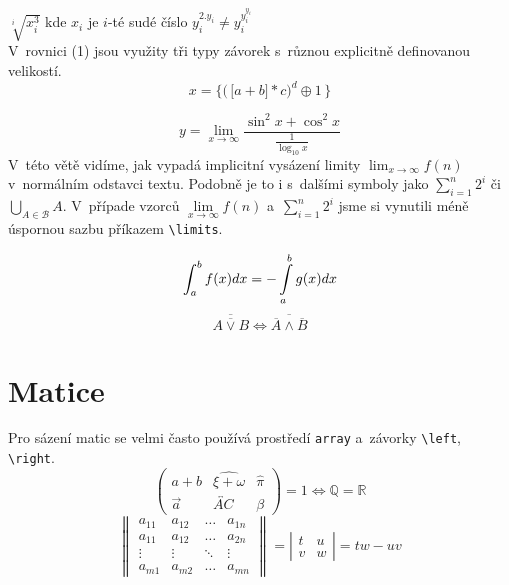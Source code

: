 \documentclass[a4paper, 11pt, twocolumn]{article}
\theoremstyle{definition}
\theoremstyle{definition}
\begin{document}
\quad $\sqrt[i]{x_i^3}$ kde $x_i$ je $i$-té sudé číslo \quad $y_i^{2.y_i}\neq y_i^{y_i^{y_i}}$\\


V~rovnici (1) jsou využity tři typy závorek s~různou explicitně definovanou velikostí.
\begin{equation}\label{rovnice_1}
x =\bigg\{\Big( \,\big[a + b\big] * c\Big)^d \oplus 1 \,\bigg\} 
\end{equation}

$$
y = \lim_{x\to\infty} \frac{\sin^2 x + \cos^2x}{\frac{1}{\log_{10}{x}}}
$$
V~této větě vidíme, jak vypadá implicitní vysázení limity $\lim_{x\to\infty} f(n)$ v~normálním odstavci textu. Podobně je to i s~dalšími symboly jako $\sum_{i=1}^{n} 2^{i}$ či $\bigcup_{A\in \mathcal{B}} A$. V~případe vzorců $\lim\limits_{x\to\infty} f(n)$ a~$\sum\limits_{i=1}^{n} 2^{i}$ jsme si vynutili méně úspornou sazbu příkazem \verb|\limits|.

\begin{equation}\label{rovnice_2}
\int_{a}^{b} f(x)dx = -\int\displaylimits_{a}^{b} g(x)dx
\end{equation}
\begin{equation}\label{rovnice_3}
\overline{\overline{ A\lor B}} \Leftrightarrow \overline{\overline{A} \land \overline{B}}
\end{equation}

\section{Matice}
Pro sázení matic se velmi často používá prostředí \verb|array| a~závorky \verb|\left|, \verb|\right|.
$$
\left(
\begin{array}{ccc}
a + b & \widehat{\xi + \omega} & \hat{\pi}\\
\vec{a} & \overleftrightarrow{AC} & \beta
\end{array}
\right) = 1 \iff \mathbb{Q} = \mathbb{R}
$$
$$
\left\|
\begin{array}{cccc}
a_{11} & a_{12} & \dots  & a_{1n}\\
a_{11} & a_{12} & \dots  & a_{2n}\\
\vdots & \vdots & \ddots & \vdots\\
a_{m1} & a_{m2} & \dots  & a_{mn}
\end{array}
\right\| = 
\left|
\begin{array}{cc}
t & u\\
v & w
\end{array} 
\right| = tw-uv
$$
\end{document}

